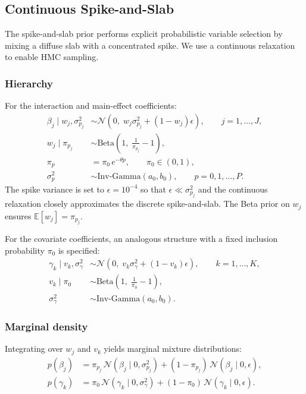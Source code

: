 \documentclass[12pt]{article}
\begin{document}
\subsection{Continuous Spike-and-Slab}

The spike-and-slab prior performs explicit probabilistic variable selection
by mixing a diffuse slab with a concentrated spike. We use a continuous
relaxation to enable HMC sampling.

\subsubsection{Hierarchy}
For the interaction and main-effect coefficients:
\begin{align}
\beta_j \mid w_j, \sigma^2_{p_j} &\sim \mathcal{N}\!\left(0,\; w_j \sigma^2_{p_j} + (1-w_j)\epsilon\right), \qquad j = 1, \dots, J,\\
w_j \mid \pi_{p_j} &\sim \mathrm{Beta}\!\left(1,\; \frac{1}{\pi_{p_j}} - 1\right),\\
\pi_p &= \pi_0\, e^{-\theta p}, \qquad \pi_0 \in (0,1),\\
\sigma^2_p &\sim \mathrm{Inv\text{-}Gamma}(a_0, b_0), \qquad p = 0, 1, \dots, P.
\end{align}
The spike variance is set to $\epsilon = 10^{-4}$ so that $\epsilon \ll \sigma^2_{p_j}$
and the continuous relaxation closely approximates the discrete spike-and-slab.
The Beta prior on $w_j$ ensures $\mathbb{E}[w_j] = \pi_{p_j}$.

For the covariate coefficients, an analogous structure with a fixed inclusion
probability $\pi_0$ is specified:
\begin{align}
\gamma_k \mid v_k, \sigma^2_\gamma &\sim \mathcal{N}\!\left(0,\; v_k \sigma^2_\gamma + (1-v_k)\epsilon\right), \qquad k = 1, \dots, K,\\
v_k \mid \pi_0 &\sim \mathrm{Beta}\!\left(1,\; \frac{1}{\pi_0} - 1\right),\\
\sigma^2_\gamma &\sim \mathrm{Inv\text{-}Gamma}(a_0, b_0).
\end{align}

\subsubsection{Marginal density}
Integrating over $w_j$ and $v_k$ yields marginal mixture distributions:
\begin{align}
p(\beta_j) &= \pi_{p_j}\,\mathcal{N}(\beta_j \mid 0, \sigma^2_{p_j}) + (1-\pi_{p_j})\,\mathcal{N}(\beta_j \mid 0, \epsilon),\\
p(\gamma_k) &= \pi_0\,\mathcal{N}(\gamma_k \mid 0, \sigma^2_\gamma) + (1-\pi_0)\,\mathcal{N}(\gamma_k \mid 0, \epsilon).
\end{align}
\end{document}
